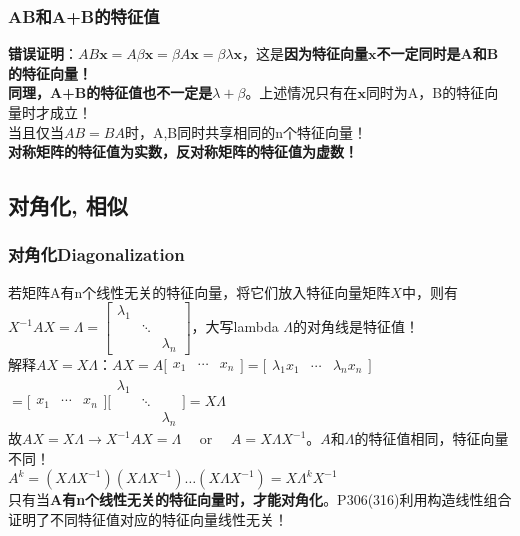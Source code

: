 \documentclass[UTF8]{article}
\begin{document}
    \subsubsection{AB和A+B的特征值}
    \textbf{错误证明}：$A B \boldsymbol{x}=A \beta \boldsymbol{x}=\beta A \boldsymbol{x}=\beta \lambda \boldsymbol{x}$，这是\textbf{因为特征向量$\bm{x}$不一定同时是A和B的特征向量！}
    \\
    \textbf{同理，A+B的特征值也不一定是$\lambda + \beta$}。上述情况只有在$\bm{x}$同时为A，B的特征向量时才成立！
    \\
    当且仅当$A B=B A$时，A,B同时共享相同的n个特征向量！\\
    \textbf{对称矩阵的特征值为实数，反对称矩阵的特征值为虚数！}
    \subsection{对角化, 相似}
    \subsubsection{对角化Diagonalization}
    若矩阵A有n个线性无关的特征向量，将它们放入特征向量矩阵$X$中，则有$X^{-1} A X=\Lambda=\left[\begin{array}{ccc}{\lambda_{1}} & {} & {} \\ {} & {\ddots} & {} \\ {} & {} & {\lambda_{n}}\end{array}\right]$，大写lambda $\Lambda$的对角线是特征值！
    \\
    解释$A X=X \Lambda$：$A X=A\Bigg[\begin{array}{lll}{x_{1}} & {\cdots} & {x_{n}}\end{array}\Bigg]=\Bigg[\begin{array}{lll}{\lambda_{1} x_{1}} & {\cdots} & {\lambda_{n} x_{n}}\end{array}\Bigg]$
    $=\Bigg[\begin{array}{ccc}{x_{1}} & {\cdots} & {x_{n}}\end{array}\Bigg]\Bigg[\begin{array}{ccc}{\lambda_{1}} & {} \\ {} & {\ddots} & {} \\ {} & {} & {\lambda_{n}}\end{array}\Bigg]=X \Lambda$
    \\
    故$A X=X \Lambda \rightarrow X^{-1} A X=\Lambda \quad$ or $\quad A=X \Lambda X^{-1}$。$A$和$\Lambda$的特征值相同，特征向量不同！
    \\
    $A^{k}=\left(X \Lambda X^{-1}\right)\left(X \Lambda X^{-1}\right) \ldots\left(X \Lambda X^{-1}\right)=X \Lambda^{k} X^{-1}$
    \\
    只有当\textbf{A有n个线性无关的特征向量时，才能对角化}。P306(316)利用构造线性组合证明了不同特征值对应的特征向量线性无关！
\end{document}
